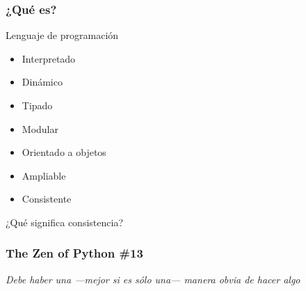 \documentclass[12pt,mathserif,compress]{beamer}
\begin{document}
\begin{frame}
  \frametitle{¿Qué es?}
Lenguaje de programación
\begin{itemize}
\item Interpretado
\item Dinámico
\item Tipado
\item Modular
\item Orientado a objetos
\item Ampliable
\item Consistente
\end{itemize}
\end{frame}

\begin{frame}
  \begin{center}
  ¿Qué significa consistencia?    
  \end{center}
\end{frame}

\begin{frame}
  \frametitle{The Zen of Python \#13}
  \begin{center}
      \textit{Debe haber una ---mejor si es sólo una--- manera obvia de
    hacer algo}
  \end{center}
\end{frame}
\end{document}
